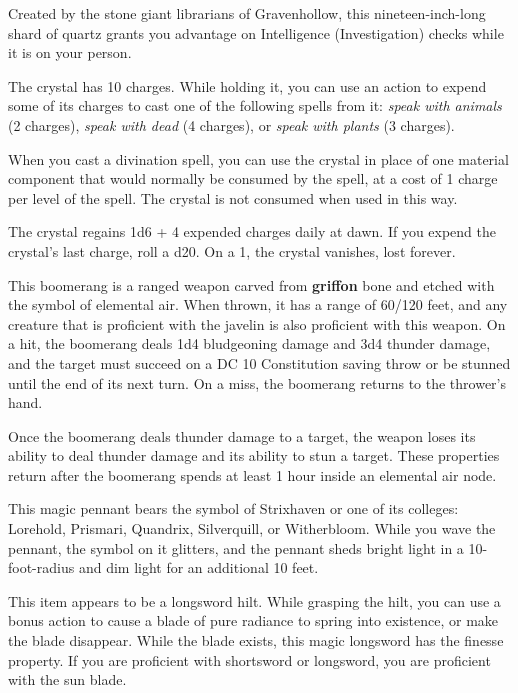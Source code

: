\documentclass[10pt,a4paper,twoside,bg=print,twocolumn,openany,nodeprecatedcode]{dndbook}
\begin{document}
Created by the stone giant librarians of Gravenhollow, this nineteen-inch-long shard of quartz grants you advantage on Intelligence (Investigation) checks while it is on your person.

The crystal has 10 charges. While holding it, you can use an action to expend some of its charges to cast one of the following spells from it: \textit{speak with animals} (2 charges), \textit{speak with dead} (4 charges), or \textit{speak with plants} (3 charges).

When you cast a divination spell, you can use the crystal in place of one material component that would normally be consumed by the spell, at a cost of 1 charge per level of the spell. The crystal is not consumed when used in this way.

The crystal regains 1d6 + 4 expended charges daily at dawn. If you expend the crystal's last charge, roll a d20. On a 1, the crystal vanishes, lost forever.

This boomerang is a ranged weapon carved from \textbf{griffon} bone and etched with the symbol of elemental air. When thrown, it has a range of 60/120 feet, and any creature that is proficient with the javelin is also proficient with this weapon. On a hit, the boomerang deals 1d4 bludgeoning damage and 3d4 thunder damage, and the target must succeed on a DC 10 Constitution saving throw or be stunned until the end of its next turn. On a miss, the boomerang returns to the thrower's hand.

Once the boomerang deals thunder damage to a target, the weapon loses its ability to deal thunder damage and its ability to stun a target. These properties return after the boomerang spends at least 1 hour inside an elemental air node.

This magic pennant bears the symbol of Strixhaven or one of its colleges: Lorehold, Prismari, Quandrix, Silverquill, or Witherbloom. While you wave the pennant, the symbol on it glitters, and the pennant sheds bright light in a 10-foot-radius and dim light for an additional 10 feet.

This item appears to be a longsword hilt. While grasping the hilt, you can use a bonus action to cause a blade of pure radiance to spring into existence, or make the blade disappear. While the blade exists, this magic longsword has the finesse property. If you are proficient with shortsword or longsword, you are proficient with the sun blade.
\end{document}
